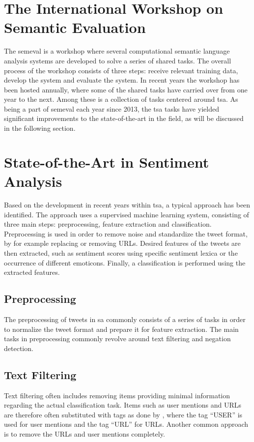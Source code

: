 \section{The International Workshop on Semantic Evaluation}
\label{sec:SemEval}
The \acf{semeval} is a workshop where several computational semantic language analysis systems are developed to solve a series of shared tasks. The overall process of the workshop consists of three steps: receive relevant training data, develop the system and evaluate the system. In recent years the workshop has been hosted annually, where some of the shared tasks have carried over from one year to the next. Among these is a collection of tasks centered around \ac{tsa}. As being a part of \ac{semeval} each year since 2013, the \ac{tsa} tasks have yielded significant improvements to the state-of-the-art in the field, as will be discussed in the following section.    

\section{State-of-the-Art in Sentiment Analysis}
\label{sec:state_of_the_art}
Based on the development in recent years within \ac{tsa}, a typical approach has been identified. The approach uses a supervised machine learning system, consisting of three main steps: preprocessing, feature extraction and classification. Preprocessing is used in order to remove noise and standardize the tweet format, by for example replacing or removing URLs. Desired features of the tweets are then extracted, such as sentiment scores using specific sentiment lexica or the occurrence of different emoticons. Finally, a classification is performed using the extracted features.

\subsection{Preprocessing}
The preprocessing of tweets in \ac{sa} commonly consists of a series of tasks in order to normalize the tweet format and prepare it for feature extraction. The main tasks in preprocessing commonly revolve around text filtering and negation detection. 

\subsection*{Text Filtering}
\label{sec:text_filtering}
Text filtering often includes removing items providing minimal information regarding the actual classification task. Items such as user mentions and URLs are therefore often substituted with tags as done by \cite{GoSentimentAnalysis09}, where the tag ``USER'' is used for user mentions and the tag ``URL'' for URLs. Another common approach is to remove the URLs and user mentions completely.\\

